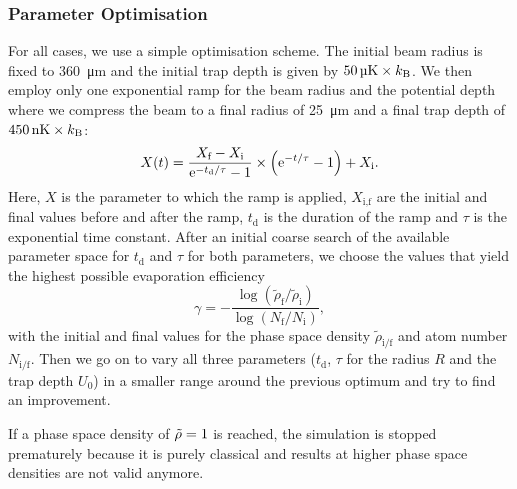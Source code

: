 \subsubsection*{Parameter Optimisation}
For all cases, we use a simple optimisation scheme. 
The initial beam radius is fixed to \SI{360}{\micro\meter} and the initial trap depth is given by $\SI{50}{\micro\kelvin}\times k_\text{B}$. We then employ only one exponential ramp for the beam radius and the potential depth where we compress the beam to a final radius of \SI{25}{\micro\meter} and a final trap depth of $\SI{450}{\nano\kelvin}\times k_\text{B}$:
\begin{equation*}
    X(t) = \frac{X_\text{f} - X_\text{i}}{\text{e}^{-t_\text{d}/\tau} - 1} \times \left(\text{e}^{-t/\tau} - 1\right) + X_\text{i}.
\end{equation*}
Here, $X$ is the parameter to which the ramp is applied, $X_\text{i,f}$ are the initial and final values before and after the ramp, $t_\text{d}$ is the duration of the ramp and $\tau$ is the exponential time constant.
After an initial coarse search of the available parameter space for $t_\text{d}$ and $\tau$ for both parameters, we choose the values that yield the highest possible evaporation efficiency
\[
    \gamma = -\frac{\log(\tilde{\rho}_\text{f}/\tilde{\rho}_\text{i})}{\log(N_\text{f}/N_\text{i})},
\]
with the initial and final values for the phase space density $\tilde{\rho}_\text{i/f}$ and atom number $N_\text{i/f}$. Then we go on to vary all three parameters ($t_\text{d}$, $\tau$ for the radius $R$ and the trap depth $U_0$) in a smaller range around the previous optimum and try to find an improvement. 

If a phase space density of $\tilde{\rho} = 1$ is reached, the simulation is stopped prematurely because it is purely classical and results at higher phase space densities are not valid anymore. 

